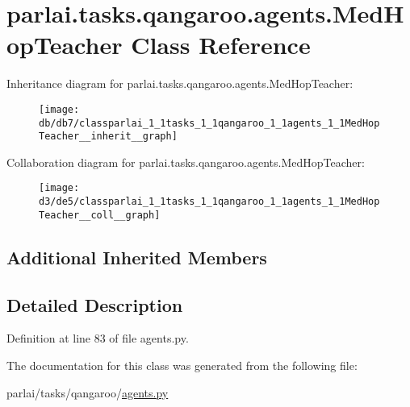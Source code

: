 \hypertarget{classparlai_1_1tasks_1_1qangaroo_1_1agents_1_1MedHopTeacher}{}\section{parlai.\+tasks.\+qangaroo.\+agents.\+Med\+Hop\+Teacher Class Reference}
\label{classparlai_1_1tasks_1_1qangaroo_1_1agents_1_1MedHopTeacher}


Inheritance diagram for parlai.\+tasks.\+qangaroo.\+agents.\+Med\+Hop\+Teacher\+:\nopagebreak
\begin{figure}[H]
\begin{center}
\leavevmode
\texttt{[image: db/db7/classparlai\_1\_1tasks\_1\_1qangaroo\_1\_1agents\_1\_1MedHopTeacher\_\_inherit\_\_graph]}
\end{center}
\end{figure}


Collaboration diagram for parlai.\+tasks.\+qangaroo.\+agents.\+Med\+Hop\+Teacher\+:\nopagebreak
\begin{figure}[H]
\begin{center}
\leavevmode
\texttt{[image: d3/de5/classparlai\_1\_1tasks\_1\_1qangaroo\_1\_1agents\_1\_1MedHopTeacher\_\_coll\_\_graph]}
\end{center}
\end{figure}
\subsection*{Additional Inherited Members}


\subsection{Detailed Description}


Definition at line 83 of file agents.\+py.



The documentation for this class was generated from the following file\+:\begin{DoxyCompactItemize}
\item 
parlai/tasks/qangaroo/\hyperlink{parlai_2tasks_2qangaroo_2agents_8py}{agents.\+py}\end{DoxyCompactItemize}

